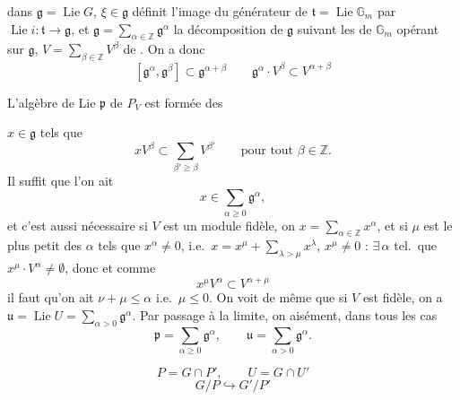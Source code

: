 \documentclass[11pt,a4paper]{article}
\begin{document}
 dans $\mathfrak{g} = \operatorname{Lie} G$, $\xi \in
\mathfrak{g}$ définit l'image du générateur  de
$\mathfrak{t} = \operatorname{Lie} \mathbb{G}_{m}$ par
$\operatorname{Lie} i : \mathfrak{t} \to \mathfrak{g}$, et
$\mathfrak{g} = \sum_{\alpha \in \mathbb{Z}} \mathfrak{g}^{\alpha}$ la
décomposition de $\mathfrak{g}$ suivant les  de
$\mathbb{G}_{m}$ opérant sur $\mathfrak{g}$,
$V = \sum_{\beta \in \mathbb{Z}} V^{\beta}$ de . On a donc
\[
[\mathfrak{g}^{\alpha}, \mathfrak{g}^{\beta}] \subset
\mathfrak{g}^{\alpha + \beta}
\qquad
\mathfrak{g}^{\alpha} \cdot V^{\beta} \subset V^{\alpha + \beta}
\]

L'algèbre de Lie $\mathfrak{p}$ de $P_{V}$ est formée des

$x \in \mathfrak{g}$ tels que
\[
x V^{\beta} \subset \sum_{\beta' \geq \beta} V^{\beta'}
\qquad \text{pour tout } \beta \in \mathbb{Z} .
\]
Il suffit que l'on ait
\[
x \in \sum_{\alpha \geq 0} \mathfrak{g}^{\alpha} ,
\]
et c'est aussi nécessaire si $V$ est un module fidèle, on 
$x = \sum_{\alpha \in \mathbb{Z}} x^{\alpha}$, et si \struck{$\alpha$} $\mu$
est le plus petit des $\alpha$ tels que $x^{\alpha} \neq 0$, i.e.\ $x = x^{\mu} + \sum_{\lambda > \mu} x^{\lambda}$, $x^{\mu} \neq 0$ :
\struck{\ill{}} $\exists\, \alpha$ tel.\ que
$x^{\mu} \cdot V^{\alpha} \neq \emptyset$, donc et comme
\[
x^{\mu} V^{\alpha} \subset V^{\alpha + \mu}
\]
il faut qu'on ait $\nu + \mu \leq \alpha$ i.e.\ $\mu \leq 0$.
On voit \ill{} de même que si $V$ est fidèle, on a
$\mathfrak{u} = \operatorname{Lie} U = \sum_{\alpha > 0}
\mathfrak{g}^{\alpha}$. Par passage à la limite, on 
aisément, dans tous les cas
\[
\mathfrak{p} = \sum_{\alpha \geq 0} \mathfrak{g}^{\alpha} , \qquad
\mathfrak{u} = \sum_{\alpha > 0} \mathfrak{g}^{\alpha} .
\]

\[
P = G \cap P' , \qquad U = G \cap U'
\]
\[
G/P \hookrightarrow G'/P'
\]
\end{document}
